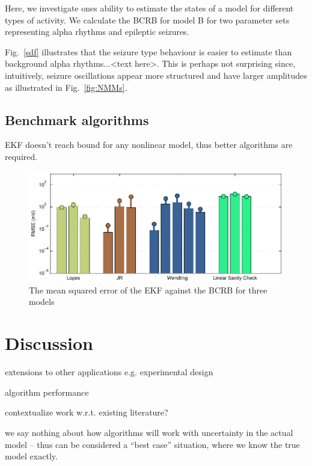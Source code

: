 \documentclass{article}
\begin{document}
Here, we investigate ones ability to estimate the states of a model for different types of activity. We calculate the BCRB for model B for two parameter sets representing alpha rhythms and epileptic seizures.

Fig.~\ref{sdf} illustrates that the seizure type behaviour is easier to estimate than background alpha rhythms...<text here>. This is perhaps not surprising since, intuitively, seizure oscillations appear more structured and have larger amplitudes as illustrated in Fig.~\ref{fig:NMMs}.

\subsection{Benchmark algorithms}

EKF doesn't reach bound for any nonlinear model, thus better algorithms are required.

\begin{figure}[ht]
  \begin{center}
    \includegraphics{./figures/pdf/CRBbar}
  \end{center}
  \caption{The mean squared error of the EKF against the BCRB for three models}
  \label{fig:CrbBar}
\end{figure}


\section{Discussion}

extensions to other applications e.g. experimental design

algorithm performance

contextualize work w.r.t. existing literature?

we say nothing about how algorithms will work with uncertainty in the actual model -- thus can be considered a ``best case'' situation, where we know the true model exactly.
\end{document}
